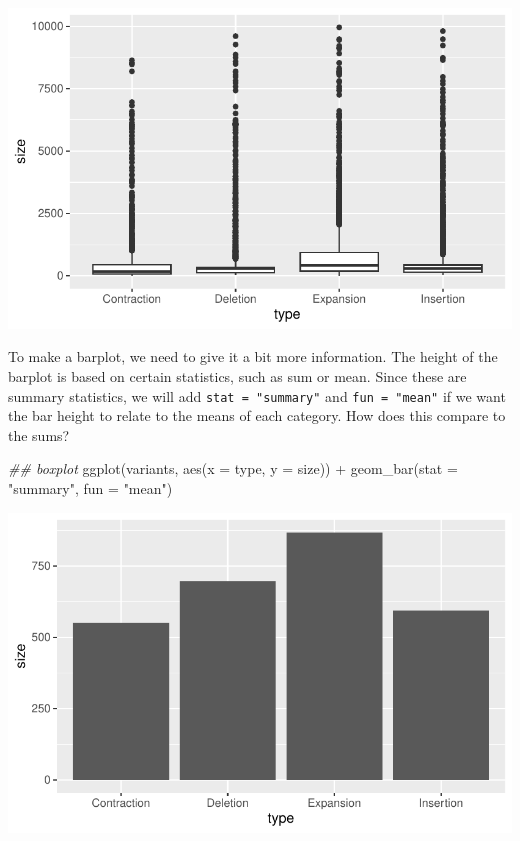 \documentclass[
  letterpaper,
  DIV=11,
  numbers=noendperiod]{scrreprt}
\newenvironment{Shaded}{\begin{snugshade}}{\end{snugshade}}
\newcommand{\AttributeTok}[1]{\textcolor[rgb]{0.40,0.45,0.13}{#1}}
\newcommand{\DocumentationTok}[1]{\textcolor[rgb]{0.37,0.37,0.37}{\textit{#1}}}
\newcommand{\FunctionTok}[1]{\textcolor[rgb]{0.28,0.35,0.67}{#1}}
\newcommand{\NormalTok}[1]{\textcolor[rgb]{0.00,0.23,0.31}{#1}}
\newcommand{\SpecialCharTok}[1]{\textcolor[rgb]{0.37,0.37,0.37}{#1}}
\newcommand{\StringTok}[1]{\textcolor[rgb]{0.13,0.47,0.30}{#1}}
\begin{document}
\includegraphics{scripts/02_dataViz/class3_files/figure-pdf/unnamed-chunk-19-1.pdf}

To make a barplot, we need to give it a bit more information. The height
of the barplot is based on certain statistics, such as sum or mean.
Since these are summary statistics, we will add
\texttt{stat\ =\ "summary"} and \texttt{fun\ =\ "mean"} if we want the
bar height to relate to the means of each category. How does this
compare to the sums?

\begin{Shaded}
\begin{Highlighting}[]
\DocumentationTok{\#\# boxplot}
\FunctionTok{ggplot}\NormalTok{(variants, }\FunctionTok{aes}\NormalTok{(}\AttributeTok{x =}\NormalTok{ type, }\AttributeTok{y =}\NormalTok{ size)) }\SpecialCharTok{+}
  \FunctionTok{geom\_bar}\NormalTok{(}\AttributeTok{stat =} \StringTok{"summary"}\NormalTok{, }\AttributeTok{fun =} \StringTok{"mean"}\NormalTok{)}
\end{Highlighting}
\end{Shaded}

\includegraphics{scripts/02_dataViz/class3_files/figure-pdf/unnamed-chunk-20-1.pdf}
\end{document}
